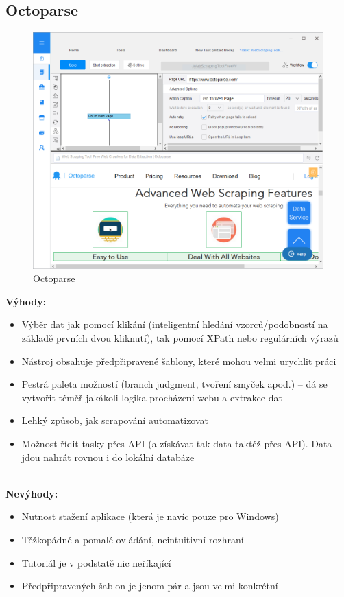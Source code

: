\documentclass[thesis=B,czech]{FITthesis}[2012/06/26]
\begin{document}
\newpage
\subsection{Octoparse}
\begin{figure}[h]
	\includegraphics[width=\linewidth]{images/Octoparse.png}
	\caption{Octoparse}
	\label{fig:octoparse}
\end{figure}

\textbf{Výhody:}
\begin{itemize}
	\item Výběr dat jak pomocí klikání (inteligentní hledání vzorců/podobností na základě prvních dvou kliknutí), tak pomocí XPath nebo regulárních výrazů
	\item Nástroj obsahuje předpřipravené šablony, které mohou velmi urychlit práci
	\item Pestrá paleta možností (branch judgment, tvoření smyček apod.) -- dá se vytvořit téměř jakákoli logika procházení webu a extrakce dat
	\item Lehký způsob, jak scrapování automatizovat
	\item Možnost řídit tasky přes API (a získávat tak data taktéž přes API). Data jdou nahrát rovnou i do lokální databáze\\\\
\end{itemize}

\textbf{Nevýhody:}
\begin{itemize}
	\item Nutnost stažení aplikace (která je navíc pouze pro Windows)
	\item Těžkopádné a pomalé ovládání, neintuitivní rozhraní
	\item Tutoriál je v podstatě nic neříkající
	\item Předpřipravených šablon je jenom pár a jsou velmi konkrétní
\end{itemize}
\end{document}
